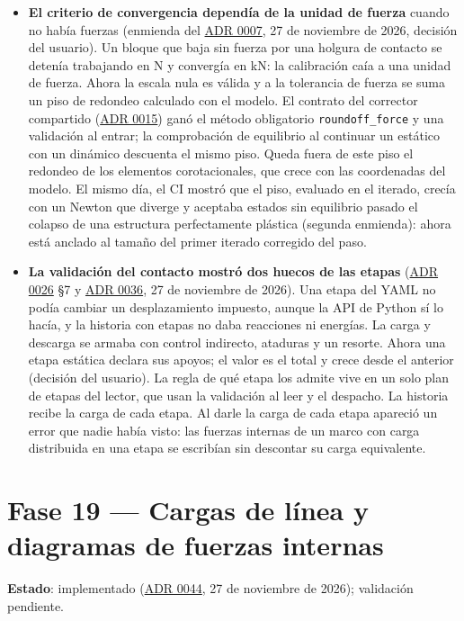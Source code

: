 \documentclass[11pt,oneside]{report}
\begin{document}
\begin{itemize}
  \item \textbf{El criterio de convergencia dependía de la unidad de fuerza} cuando no había fuerzas (enmienda del \hyperref[adr:0007]{ADR 0007}, 27 de noviembre de 2026, decisión del usuario). Un bloque que baja sin fuerza por una holgura de contacto se detenía trabajando en N y convergía en kN: la calibración caía a una unidad de fuerza. Ahora la escala nula es válida y a la tolerancia de fuerza se suma un piso de redondeo calculado con el modelo. El contrato del corrector compartido (\hyperref[adr:0015]{ADR 0015}) ganó el método obligatorio \texttt{roundoff\_force} y una validación al entrar; la comprobación de equilibrio al continuar un estático con un dinámico descuenta el mismo piso. Queda fuera de este piso el redondeo de los elementos corotacionales, que crece con las coordenadas del modelo. El mismo día, el CI mostró que el piso, evaluado en el iterado, crecía con un Newton que diverge y aceptaba estados sin equilibrio pasado el colapso de una estructura perfectamente plástica (segunda enmienda): ahora está anclado al tamaño del primer iterado corregido del paso.
  \item \textbf{La validación del contacto mostró dos huecos de las etapas} (\hyperref[adr:0026]{ADR 0026} §7 y \hyperref[adr:0036]{ADR 0036}, 27 de noviembre de 2026). Una etapa del YAML no podía cambiar un desplazamiento impuesto, aunque la API de Python sí lo hacía, y la historia con etapas no daba reacciones ni energías. La carga y descarga se armaba con control indirecto, ataduras y un resorte. Ahora una etapa estática declara sus apoyos; el valor es el total y crece desde el anterior (decisión del usuario). La regla de qué etapa los admite vive en un solo plan de etapas del lector, que usan la validación al leer y el despacho. La historia recibe la carga de cada etapa. Al darle la carga de cada etapa apareció un error que nadie había visto: las fuerzas internas de un marco con carga distribuida en una etapa se escribían sin descontar su carga equivalente.
\end{itemize}

\section{Fase 19 --- Cargas de línea y diagramas de fuerzas internas}

\textbf{Estado}: implementado (\hyperref[adr:0044]{ADR 0044}, 27 de noviembre de 2026); validación pendiente.
\end{document}
